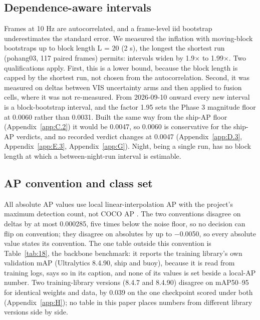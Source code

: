 \documentclass[10pt]{article}
\begin{document}
\subsection{Dependence-aware intervals}\label{app:C.3}
Frames at 10 Hz are autocorrelated, and a frame-level iid bootstrap underestimates the standard error. We measured the inflation with moving-block bootstraps \citep{kunsch1989the} up to block length L = 20 (2 s), the longest the shortest run (pohang03, 117 paired frames) permits: intervals widen by 1.9$\times$ to 1.99$\times$. Two qualifications apply. First, this is a lower bound, because the block length is capped by the shortest run, not chosen from the autocorrelation. Second, it was measured on deltas between VIS uncertainty arms and then applied to fusion cells, where it was not re-measured. From 2026-09-10 onward every new interval is a block-bootstrap interval, and the factor 1.95 sets the Phase 3 magnitude floor at 0.0060 rather than 0.0031. Built the same way from the ship-AP floor (Appendix~\ref{app:C.2}) it would be 0.0047, so 0.0060 is conservative for the ship-AP verdicts, and no recorded verdict changes at 0.0047 (Appendix~\ref{app:D.3}, Appendix~\ref{app:E.3}, Appendix~\ref{app:G}). Night, being a single run, has no block length at which a between-night-run interval is estimable.

\subsection{AP convention and class set}\label{app:C.4}
All absolute AP values use local linear-interpolation AP with the project's maximum detection count, not COCO AP \citep{lin2014microsoft}. The two conventions disagree on deltas by at most 0.000285, five times below the noise floor, so no decision can flip on convention; they disagree on absolutes by up to $-$0.0050, so every absolute value states its convention. The one table outside this convention is Table~\ref{tab:18}, the backbone benchmark: it reports the training library's own validation mAP (Ultralytics 8.4.90, ship and buoy), because it is read from training logs, says so in its caption, and none of its values is set beside a local-AP number. Two training-library versions (8.4.7 and 8.4.90) disagree on mAP50--95 for identical weights and data, by 0.039 on the one checkpoint scored under both (Appendix~\ref{app:H}); no table in this paper places numbers from different library versions side by side.
\end{document}
